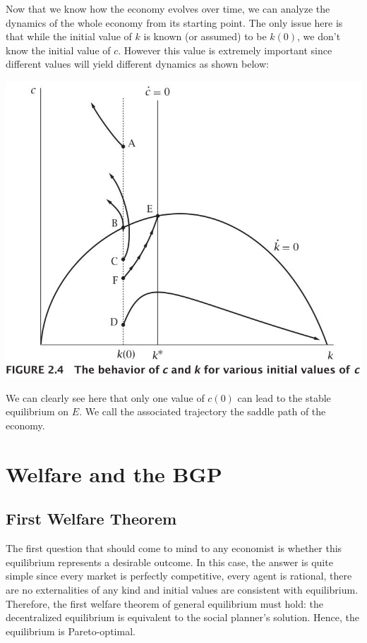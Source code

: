 \documentclass[12pt]{report}
\begin{document}
Now that we know how the economy evolves over time, we can analyze the dynamics of the whole economy from its starting point. The only issue here is that while the initial value of $k$ is known (or assumed) to be $k(0)$, we don't know the initial value of $c$. However this value is extremely important since different values will yield different dynamics as shown below:\begin{center}
\includegraphics[scale=0.65]{images/Ramseyinitc}
\end{center}
We can clearly see here that only one value of $c(0)$ can lead to the stable equilibrium on $E$. We call the associated trajectory the saddle path of the economy.

\section{Welfare and the BGP}

\subsection{First Welfare Theorem}

The first question that should come to mind to any economist is whether this equilibrium represents a desirable outcome. In this case, the answer is quite simple since every market is perfectly competitive, every agent is rational, there are no externalities of any kind and initial values are consistent with equilibrium. Therefore, the first welfare theorem of general equilibrium must hold: the decentralized equilibrium is equivalent to the social planner's solution. Hence, the equilibrium is Pareto-optimal.
\end{document}
